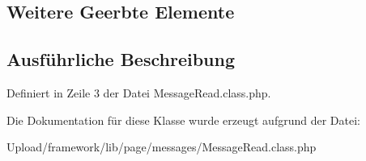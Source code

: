 \subsection*{Weitere Geerbte Elemente}


\subsection{Ausführliche Beschreibung}


Definiert in Zeile 3 der Datei Message\+Read.\+class.\+php.



Die Dokumentation für diese Klasse wurde erzeugt aufgrund der Datei\+:\begin{DoxyCompactItemize}
\item 
Upload/framework/lib/page/messages/Message\+Read.\+class.\+php\end{DoxyCompactItemize}
